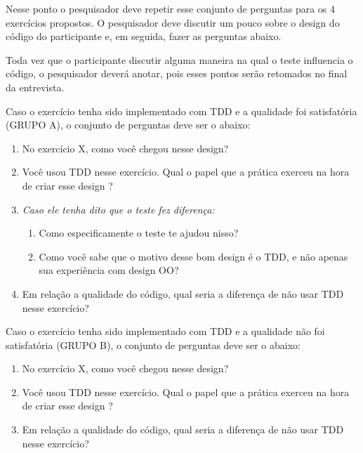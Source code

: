 Nesse ponto o pesquisador deve repetir esse conjunto de perguntas
para os 4 exercícios propostos.
O pesquisador deve discutir um pouco sobre o design do código do participante e, em seguida,
fazer as perguntas abaixo.

Toda vez que o participante discutir alguma maneira na qual o teste influencia
o código, o pesquisador deverá anotar, pois esses pontos serão retomados no final
da entrevista.

Caso o exercício tenha sido implementado com TDD e a qualidade foi satisfatória (GRUPO A),
o conjunto de perguntas deve ser o abaixo:

\begin{enumerate}
	
	\item No exercício X, como você chegou nesse design? 

	\item Você usou TDD nesse exercício. Qual o papel que a prática exerceu na hora de criar esse design ?
	
	\item \textit{Caso ele tenha dito que o teste fez diferença:}
		\begin{enumerate}
			\item Como especificamente o teste te ajudou nisso?
	
			\item Como você sabe que o motivo desse bom design é o TDD, e não apenas sua experiência
			com design OO?
		\end{enumerate}
	
	\item Em relação a qualidade do código, qual seria a diferença de não usar TDD nesse exercício?
\end{enumerate}

Caso o exercício tenha sido implementado com TDD e a qualidade não foi satisfatória (GRUPO B),
o conjunto de perguntas deve ser o abaixo:

\begin{enumerate}
	
	\item No exercício X, como você chegou nesse design?
	
	\item Você usou TDD nesse exercício. Qual o papel que a prática exerceu na hora de criar esse design ?
	
	\item Em relação a qualidade do código, qual seria a diferença de não usar TDD nesse exercício?

\end{enumerate}

